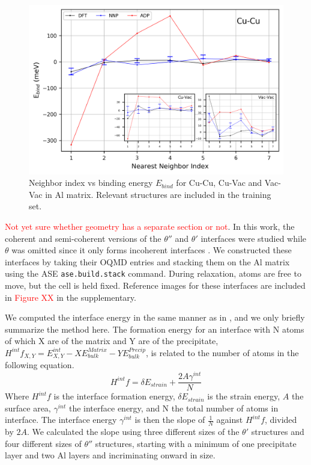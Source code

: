 \documentclass{article}
\begin{document}
\begin{figure}[H]%
\centering%
\includegraphics[width=1.2\textwidth,center]{./figures/solsol_in_al.png}%
\caption{Neighbor index vs binding energy $E_{bind}$ for Cu-Cu, Cu-Vac and Vac-Vac in Al matrix. 
Relevant structures are included in the training set.}%
\label{fig:solsol_in_al}
\end{figure}

\textcolor{red}{Not yet sure whether geometry has a separate section or not}.
In this work, the coherent and semi-coherent versions of the $\theta''$ and $\theta'$ interfaces were studied while $\theta$ was omitted since it only forms incoherent interfaces \cite{Nie2014PhysicalAlloys}.
We constructed these interfaces by taking their OQMD entries and stacking them on the Al matrix using the ASE \texttt{ase.build.stack} command.
During relaxation, atoms are free to move, but the cell is held fixed. 
Reference images for these interfaces are included in \textcolor{red}{Figure XX} in the supplementary.

We computed the interface energy in the same manner as in \cite{Vaithyanathan2004MultiscaleAlloys}, and we only briefly summarize the method here.
The formation energy for an interface with N atoms of which X are of the matrix and Y are of the precipitate,
$H^{int}f_{X,Y} = E^{int}_{X,Y}-XE^{Matrix}_{bulk}-YE^{Precip}_{bulk}$,
is related to the number of atoms in the following equation. 
\begin{equation}
H^{int}f = \delta E_{strain} + \frac{2A\gamma^{int}}{N}
\end{equation}
Where $H^{int}f$ is the interface formation energy, $\delta E_{strain}$ is the strain energy, $A$ the surface area,
$\gamma^{int}$ the interface energy, and N the total number of atoms in interface.
The interface energy $\gamma^{int}$ is then the slope of $\frac{1}{N}$ against $H^{int}f$, divided by $2A$.
We calculated the slope using three different sizes of the $\theta'$ structures and four different sizes of $\theta''$ structures, starting with a minimum of one precipitate layer and two Al layers and incriminating onward in size. 
\end{document}
